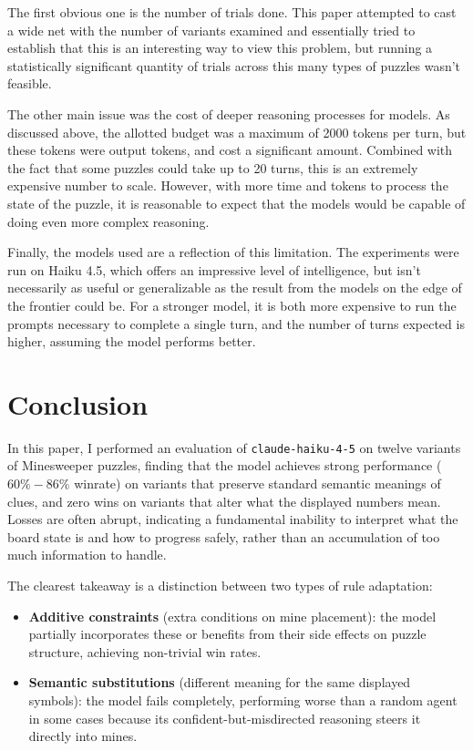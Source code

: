 \documentclass[11pt,conference,compsoc]{IEEEtran}
\begin{document}
The first obvious one is the number of trials done. This paper attempted to cast a wide net with the number of variants examined and essentially tried to establish that this is an interesting way to view this problem, but running a statistically significant quantity of trials across this many types of puzzles wasn't feasible.

The other main issue was the cost of deeper reasoning processes for models. As discussed above, the allotted budget was a maximum of 2000 tokens per turn, but these tokens were output tokens, and cost a significant amount. Combined with the fact that some puzzles could take up to 20 turns, this is an extremely expensive number to scale. However, with more time and tokens to process the state of the puzzle, it is reasonable to expect that the models would be capable of doing even more complex reasoning.

Finally, the models used are a reflection of this limitation. The experiments were run on Haiku 4.5, which offers an impressive level of intelligence, but isn't necessarily as useful or generalizable as the result from the models on the edge of the frontier could be. For a stronger model, it is both more expensive to run the prompts necessary to complete a single turn, and the number of turns expected is higher, assuming the model performs better.

\section{Conclusion}

In this paper, I performed an evaluation of \texttt{claude-haiku-4-5} on twelve variants of Minesweeper puzzles, finding that the model achieves strong performance ($60\%-86\%$ winrate) on variants that preserve standard semantic meanings of clues, and zero wins on variants that alter what the displayed numbers mean. Losses are often abrupt, indicating a fundamental inability to interpret what the board state is and how to progress safely, rather than an accumulation of too much information to handle.

The clearest takeaway is a distinction between two types of rule adaptation:
\begin{itemize}[topsep=2pt,itemsep=2pt]
  \item \textbf{Additive constraints} (extra conditions on mine placement): the model
        partially incorporates these or benefits from their side effects on puzzle
        structure, achieving non-trivial win rates.
  \item \textbf{Semantic substitutions} (different meaning for the same displayed
        symbols): the model fails completely, performing worse than a random agent in
        some cases because its confident-but-misdirected reasoning steers it directly
        into mines.
\end{itemize}
\end{document}

